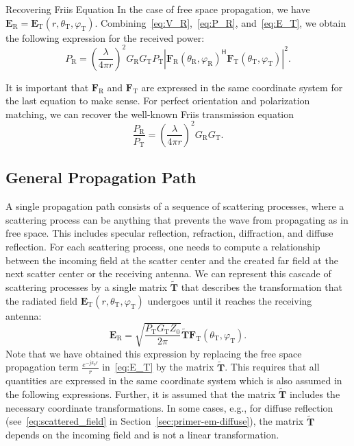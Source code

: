 \begin{highlightbox}{Recovering Friis Equation}
   In the case of free space propagation, we have $\mathbf{E}_\text{R}=\mathbf{E}_\text{T}(r,\theta_\text{T},\varphi_\text{T})$.
    Combining~\eqref{eq:V_R},~\eqref{eq:P_R}, and~\eqref{eq:E_T}, we obtain the following expression for the received power:
    \begin{equation}
        P_\text{R} = \left(\frac{\lambda}{4\pi r}\right)^2 G_\text{R} G_\text{T} P_\text{T} \left|\mathbf{F}_\text{R}(\theta_\text{R}, \varphi_\text{R})^{\mathsf{H}} \mathbf{F}_\text{T}(\theta_\text{T}, \varphi_\text{T})\right|^2.
    \end{equation}

    It is important that $\mathbf{F}_\text{R}$ and $\mathbf{F}_\text{T}$ are expressed in the same coordinate system for the last equation to make sense.
    For perfect orientation and polarization matching, we can recover the well-known Friis transmission equation
    \begin{equation}
        \frac{P_\text{R}}{P_\text{T}} = \left(\frac{\lambda}{4\pi r}\right)^2 G_\text{R} G_\text{T}.
    \end{equation}
\end{highlightbox}

\subsection{General Propagation Path}
\label{sec:primer-em-path}

A single propagation path consists of a sequence of scattering processes, where a scattering process can be anything that prevents the wave from propagating as in free space. This includes specular reflection, refraction, diffraction, and diffuse reflection. For each scattering process, one needs to compute a relationship between the incoming field at the scatter center and the created far field at the next scatter center or the receiving antenna.
We can represent this cascade of scattering processes by a single matrix $\widetilde{\mathbf{T}}$ that describes the transformation that the radiated field $\mathbf{E}_\text{T}(r, \theta_\text{T}, \varphi_\text{T})$ undergoes until it reaches the receiving antenna:
\begin{equation}
    \label{eq:E_R}
    \mathbf{E}_\text{R} = \sqrt{ \frac{P_\text{T} G_\text{T} Z_0}{2\pi}} \widetilde{\mathbf{T}} \mathbf{F}_\text{T}(\theta_\text{T}, \varphi_\text{T}).
\end{equation}
Note that we have obtained this expression by replacing the free space propagation term $\frac{e^{-jk_0r}}{r}$ in~\eqref{eq:E_T} by the matrix $\widetilde{\mathbf{T}}$. This requires that all quantities are expressed in the same coordinate system which is also assumed in the following expressions. Further, it is assumed that the matrix $\widetilde{\mathbf{T}}$ includes the necessary coordinate transformations. In some cases, e.g., for diffuse reflection (see~\eqref{eq:scattered_field} in Section~\ref{sec:primer-em-diffuse}), the matrix $\widetilde{\mathbf{T}}$ depends on the incoming field and is not a linear transformation.

